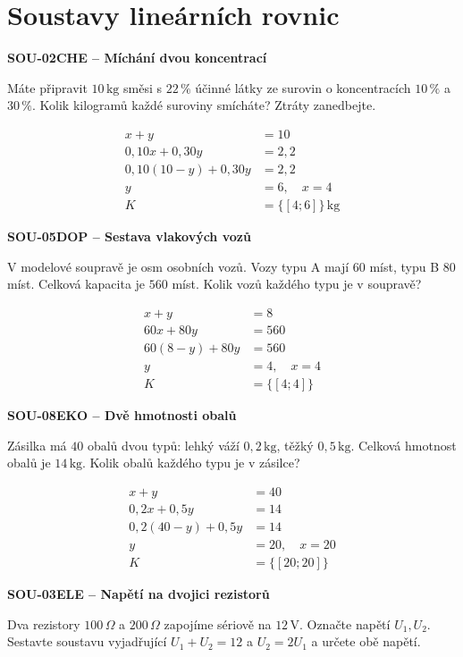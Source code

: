 \documentclass[11pt,a4paper]{article}
\begin{document}
\section{Soustavy lineárních rovnic}
\par\medskip\noindent
\textbf{SOU-02}\quad\textbf{CHE -- Míchání dvou koncentrací}\par
Máte připravit $10\,\mathrm{kg}$ směsi s $22\,\%$ účinné látky ze surovin o koncentracích $10\,\%$ a $30\,\%$. Kolik kilogramů každé suroviny smícháte? Ztráty zanedbejte.
\par\[\begin{aligned}
x+y&=10\\0{,}10x+0{,}30y&=2{,}2\\0{,}10(10-y)+0{,}30y&=2{,}2\\y&=6,\quad x=4\\K&=\{[4;6]\}\,\mathrm{kg}
\end{aligned}\]
\par\medskip\noindent
\textbf{SOU-05}\quad\textbf{DOP -- Sestava vlakových vozů}\par
V modelové soupravě je osm osobních vozů. Vozy typu A mají $60$ míst, typu B $80$ míst. Celková kapacita je $560$ míst. Kolik vozů každého typu je v soupravě?
\par\[\begin{aligned}
x+y&=8\\60x+80y&=560\\60(8-y)+80y&=560\\y&=4,\quad x=4\\K&=\{[4;4]\}
\end{aligned}\]
\par\medskip\noindent
\textbf{SOU-08}\quad\textbf{EKO -- Dvě hmotnosti obalů}\par
Zásilka má $40$ obalů dvou typů: lehký váží $0{,}2\,\mathrm{kg}$, těžký $0{,}5\,\mathrm{kg}$. Celková hmotnost obalů je $14\,\mathrm{kg}$. Kolik obalů každého typu je v zásilce?
\par\[\begin{aligned}
x+y&=40\\0{,}2x+0{,}5y&=14\\0{,}2(40-y)+0{,}5y&=14\\y&=20,\quad x=20\\K&=\{[20;20]\}
\end{aligned}\]
\par\medskip\noindent
\textbf{SOU-03}\quad\textbf{ELE -- Napětí na dvojici rezistorů}\par
Dva rezistory $100\,\Omega$ a $200\,\Omega$ zapojíme sériově na $12\,\mathrm V$. Označte napětí $U_1,U_2$. Sestavte soustavu vyjadřující $U_1+U_2=12$ a $U_2=2U_1$ a určete obě napětí.
\end{document}
